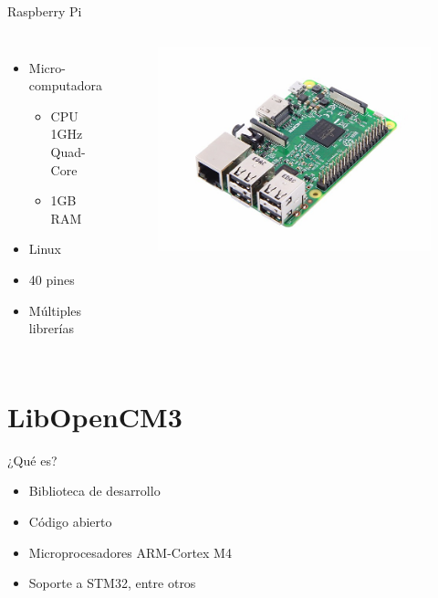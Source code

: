 \documentclass[10pt]{beamer}
\begin{document}
\begin{frame}{Raspberry Pi}
	\begin{columns}
			\begin{itemize}
				\item Micro-computadora
                	\begin{itemize}
                		\item CPU 1GHz Quad-Core
                        \item 1GB RAM
                	\end{itemize}
                \item Linux
                \item 40 pines
                \item Múltiples librerías
			\end{itemize}
			\begin{center}
				\begin{figure}
					\includegraphics[width=1\textwidth]{img/pi3.jpg}
				\end{figure}
			\end{center}
	\end{columns}
\end{frame}

\section{LibOpenCM3}

\begin{frame}{¿Qué es?}
	\begin{itemize}
		\item Biblioteca de desarrollo
        \item Código abierto
        \item Microprocesadores ARM-Cortex M4
        \item Soporte a STM32, entre otros
	\end{itemize}
\end{frame}
\end{document}
